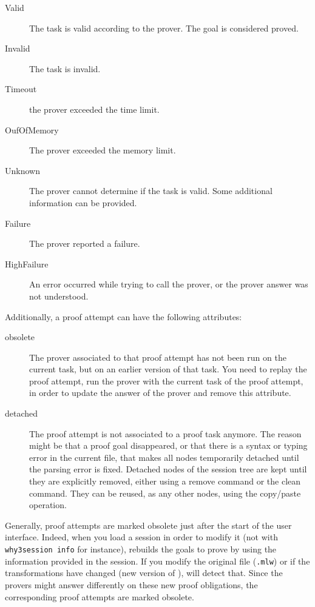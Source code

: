 \begin{description}
\item[Valid] The task is valid according to the prover. The
  goal is considered proved.
\item[Invalid] The task is invalid.
\item[Timeout] the prover exceeded the time limit.
\item[OufOfMemory] The prover exceeded the memory limit.
\item[Unknown] The prover cannot determine if the task
  is valid. Some additional information can be provided.
\item[Failure] The prover reported a failure.
\item[HighFailure] An error occurred while trying to call the
  prover, or the prover answer was not understood.
\end{description}

Additionally, a proof attempt can have the following attributes:

\begin{description}
\item[obsolete] The prover associated to
  that proof attempt has not been run on the current task, but on an
  earlier version of that task. You need to replay the proof
  attempt, \ie run the prover with the current task of the proof
  attempt, in order to update the answer of the prover and remove this
  attribute.
\item[detached] The proof attempt is not
  associated to a proof task anymore. The reason might be that a proof
  goal disappeared, or that there is a syntax or typing error in the
  current file, that makes all nodes temporarily detached until the
  parsing error is fixed. Detached nodes of the session tree are kept
  until they are explicitly removed, either using a remove command or
  the clean command. They can be reused, as any other nodes, using the
  copy/paste operation.
\end{description}

Generally, proof attempts are marked obsolete just after
the start of the user interface. Indeed, when you load a session in order to
modify it (not with \texttt{why3session info} for instance), \why
rebuilds the goals to prove by using the information provided in the
session. If you modify the original file (\texttt{.mlw}) or if the
transformations have changed (new version of \why), \why will detect
that. Since the provers might answer differently on these new
proof obligations, the corresponding proof attempts are marked obsolete.

